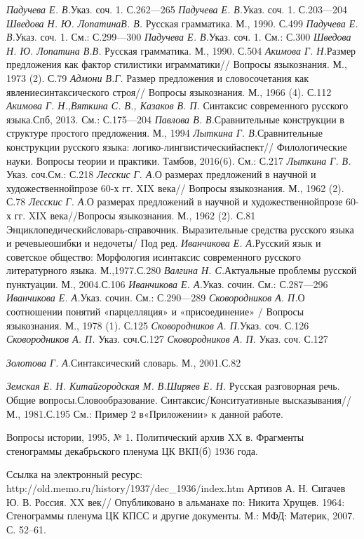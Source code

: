 \textit{{ Падучева Е. В.}}{Указ. соч. 1. С.262—265}
\textit{{ Падучева Е. В.}}{Указ. соч. 1. С.203—204}
\textit{{ Шведова Н. Ю. ЛопатинаВ. В. }}{Русская грамматика. М., 1990. С.499}
\textit{{ Падучева Е. В.}}{Указ. соч. 1. См.: С.299—300}
\textit{{ Падучева Е. В.}}{Указ. соч. 1. См.: С.300}
\textit{{ Шведова Н. Ю. Лопатина В.В. }}{Русская грамматика. М., 1990. С.504}
\textit{{ Акимова Г. Н.}}{Размер предложения как фактор стилистики играмматики// Вопросы языкознания. М., 1973 (2). С.79}
\textit{{ Адмони В.Г.}}{ Размер предложения и словосочетания как явлениесинтаксического строя// Вопросы языкознания. М., 1966 (4). С.112}
\textit{Акимова Г. Н.,Вяткина С. В., Казаков В. П. }Синтаксис современного русского языка.Спб, 2013. См.: С.175—204
\textit{Павлова В. В.}Сравнительные конструкции в структуре простого предложения. М., 1994
\textit{Лыткина Г. В.}Сравнительные конструкции русского языка: логико-лингвистическийаспект// Филологические науки. Вопросы теории и практики. Тамбов, 2016(6). См.: С.217
\textit{Лыткина Г. В. }Указ. соч.См.: С.218
\textit{{ Лесскис Г. А.}}{О размерах предложений в научной и художественнойпрозе 60-х гг. XIX века// Вопросы языкознания. М., 1962 (2). С.78}
\textit{{ Лесскис Г. А.}}{О размерах предложений в научной и художественнойпрозе 60-х гг. XIX века//Вопросы языкознания. М., 1962 (2). С.81}
 Энциклопедическийсловарь-справочник. Выразительные средства русского языка и речевыеошибки и недочеты/ Под ред. 
\textit{{ Иванчикова Е. А.}}{Русский язык и советское общество: Морфология исинтаксис современного русского литературного языка. М.,1977.}\textit{{}}{С.280}
\textit{{ Валгина Н. С.}}{Актуальные проблемы русской пунктуации. М., 2004.С.106}
\textit{{Иванчикова Е. А.}}{Указ. сочин. См.: С.287—296}
\textit{ Иванчикова Е. А.}{Указ. сочин. См.: С.290—289}
\textit{{ Сковородников А. П.}}{О соотношении понятий «парцелляция» и «присоединение» / Вопросы языкознания. М., 1978 (1). С.125}
\textit{Сковородников А. П.}{Указ. соч. С.126}
\textit{{Сковородников А. П. }}{Указ. соч.С.127}
\textit{{Сковородников А. П. }}{Указ. соч. С.127}


\textit{{ Золотова Г. А.}}{Синтаксический словарь. М., 2001.С.82}

\textit{Земская Е. Н. Китайгородская М. В.}\textit{Ширяев Е. Н. }Русская разговорная речь. Общие вопросы.Словообразование. Синтаксис/Конситуативные высказывания// М., 1981.С.195
См.: Пример 2 в«Приложении» к данной работе.

    Вопросы истории, 1995, № 1. Политический архив XX в. Фрагменты
    стенограммы декабрьского пленума ЦК ВКП(б) 1936 года.\par Ссылка на
    электронный ресурс:
    http://old.memo.ru/history/1937/dec\_1936/index.htm
 Артизов А. Н. Сигачев Ю. В. Россия. XX
    век// Опубликовано в альманахе по: Никита Хрущев. 1964: Стенограммы
    пленума ЦК КПСС и другие документы. М.: МФД: Материк, 2007. С. 52–61.